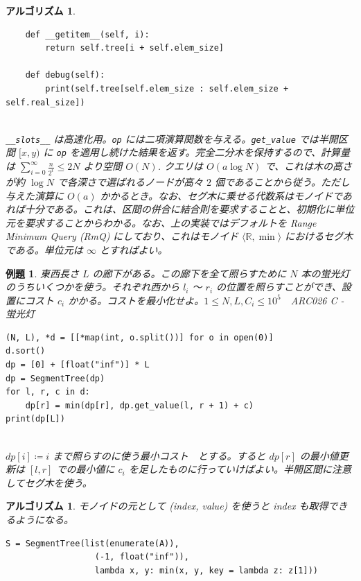 \documentclass[12pt, a4j]{ltjsarticle}
\newtheorem{alg}[thm]{アルゴリズム}
\newtheorem{exm}[thm]{例題}
\newcommand*{\SS}{\vspace{1cm}}
\begin{document}
\begin{alg}
\begin{lstlisting}
    def __getitem__(self, i):
        return self.tree[i + self.elem_size]

    def debug(self):
        print(self.tree[self.elem_size : self.elem_size + self.real_size])
\end{lstlisting}\quad\\
\lstinline{__slots__} は高速化用。\lstinline{op} には二項演算関数を与える。\lstinline{get_value} では半開区間 $[x,y)$ に \lstinline{op} を適用し続けた結果を返す。完全二分木を保持するので、計算量は $\displaystyle\sum_{i=0}^{\infty} \frac{n}{2^i} \le 2N$ より空間 $O(N)$. クエリは $O(a \log N)$ で、これは木の高さが約 $\log N$ で各深さで選ばれるノードが高々 $2$ 個であることから従う。ただし与えた演算に $O(a)$ かかるとき。なお、セグ木に乗せる代数系はモノイドであれば十分である。これは、区間の併合に結合則を要求することと、初期化に単位元を要求することからわかる。なお、上の実装ではデフォルトを Range Minimum Query (RmQ) にしており、これはモノイド $\langle \mathbb{R}, \min \rangle$ におけるセグ木である。単位元は $\infty$ とすればよい。
\end{alg}

\SS

\begin{exm}\upshape 東西長さ $L$ の廊下がある。この廊下を全て照らすために $N$ 本の蛍光灯のうちいくつかを使う。それぞれ西から $l_i$ 〜 $r_i$ の位置を照らすことができ、設置にコスト $c_i$ かかる。コストを最小化せよ。$1\le N,L,C_i\le 10^5$　ARC026 C - 蛍光灯\\
\begin{lstlisting}[frame = none]
(N, L), *d = [[*map(int, o.split())] for o in open(0)]
d.sort()
dp = [0] + [float("inf")] * L
dp = SegmentTree(dp)
for l, r, c in d:
    dp[r] = min(dp[r], dp.get_value(l, r + 1) + c)
print(dp[L])
\end{lstlisting}\quad\\
$dp[i] \coloneqq i$ まで照らすのに使う最小コスト　とする。すると $dp[r]$ の最小値更新は $[l,r]$ での最小値に $c_i$ を足したものに行っていけばよい。半開区間に注意してセグ木を使う。
\end{exm}

\SS

\begin{alg} \upshape モノイドの元として (index, value) を使うと index も取得できるようになる。\\
\begin{lstlisting}
S = SegmentTree(list(enumerate(A)),
                  (-1, float("inf")),
                  lambda x, y: min(x, y, key = lambda z: z[1]))
\end{lstlisting}
\end{alg}
\end{document}
